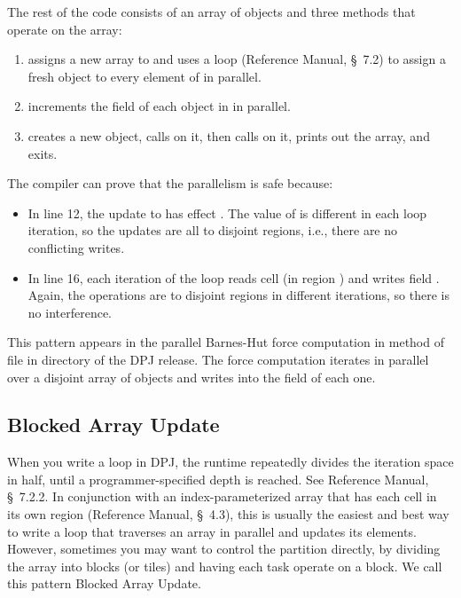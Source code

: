 The rest of the code consists of an array  of 
objects and three methods that operate on the array:
%
\begin{enumerate}
%
\item {} assigns a new array to  and uses a
   loop (Reference Manual, \S~7.2) to assign a fresh
   object to every element of  in parallel.
%
\item {} increments the  field of each 
  object in  in parallel.
%
\item {} creates a new  object, calls
   on it, then calls  on it, prints out
  the array, and exits.
%
\end{enumerate}
%
The compiler can prove that the parallelism is safe because:
%
\begin{itemize}
%
\item In line 12, the update to  has effect .  The value of  is different in each loop iteration, so
  the updates are all to disjoint regions, i.e., there are no
  conflicting writes.
%
\item In line 16, each iteration of the loop reads cell 
  (in region \kwd{[i]}) and writes field .  Again, the
  operations are to disjoint regions in different iterations, so there
  is no interference.
%
\end{itemize}

 This pattern appears in the parallel
Barnes-Hut force computation in method  of file
 in directory
 of the DPJ release.  The
force computation iterates in parallel over a disjoint array of
 objects and writes into the  field of each one.


\subsection{Blocked Array Update%
\label{sec:array:blocked}}

When you write a  loop in DPJ, the runtime repeatedly
divides the iteration space in half, until a programmer-specified
depth is reached.  See Reference Manual, \S~7.2.2.  In conjunction
with an index-parameterized array that has each cell in its own region
(Reference Manual, \S~4.3), this is usually the easiest and best way
to write a loop that traverses an array in parallel and updates its
elements.  However, sometimes you may want to control the partition
directly, by dividing the array into blocks (or tiles) and having each
task operate on a block.  We call this pattern Blocked Array Update.

